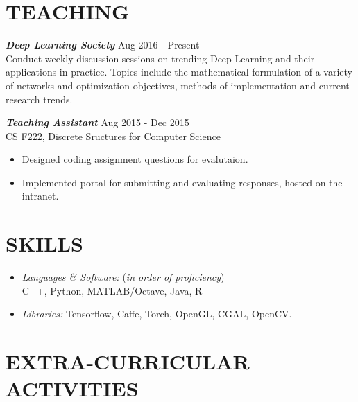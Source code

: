 \documentclass[margin, 10pt]{res} %
\begin{document}
\begin{resume}
 
\section{TEACHING}
{\sl \textbf{Deep Learning Society}} \hfill Aug 2016 - Present\\
Conduct weekly discussion sessions on trending Deep Learning and their applications in practice. Topics include the mathematical formulation of a variety of networks and optimization objectives, methods of implementation and current research trends.

{\sl \textbf{Teaching Assistant}} \hfill Aug 2015 - Dec 2015\\
CS F222, Discrete Sructures for Computer Science
\begin{itemize}  \itemsep -2pt %
\item Designed coding assignment questions for evalutaion.
\item Implemented portal for submitting and evaluating responses, hosted on the intranet.
\end{itemize}

\section{SKILLS} 

\begin{itemize}
\item {\sl Languages \& Software:} {(\it in order of proficiency}) \\
 C++, Python, MATLAB/Octave, Java, R
\item {\sl Libraries:} Tensorflow, Caffe, Torch, OpenGL, CGAL, OpenCV.
\end{itemize}


\section{EXTRA-CURRICULAR \\ ACTIVITIES} 


\end{resume}
\end{document}

